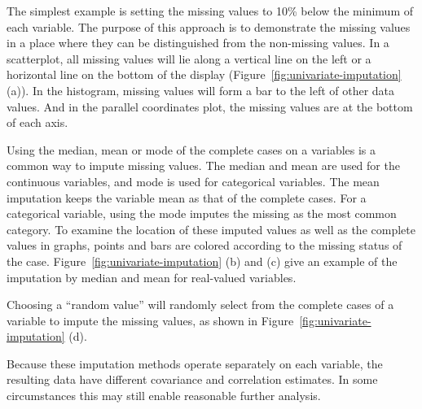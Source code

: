 \documentclass[article]{jss}
\begin{document}
The simplest example is setting the missing values to 10\% below the minimum of each variable. The purpose of this approach is to demonstrate the missing values in a place where they can be distinguished from the non-missing values. In a scatterplot, all missing values will lie along a vertical line on the left or a horizontal line on the bottom of the display (Figure~\ref{fig:univariate-imputation} (a)). In the histogram, missing values will form a bar to the left of other data values. And in the parallel coordinates plot, the missing values are at the bottom of each axis.

Using the median, mean or mode of the complete cases on a variables is a common way to impute missing values. The median and mean are used for the continuous variables, and mode is used for categorical variables. The mean imputation keeps the variable mean as that of the complete cases. For a categorical variable, using the mode imputes the missing as the most common category. To examine the location of these imputed values as well as the complete values in graphs, points and bars are colored according to the missing status of the case. Figure~\ref{fig:univariate-imputation} (b) and (c) give an example of the imputation by median and mean for real-valued variables.

Choosing a ``random value''  will randomly select from the complete cases of a variable to impute the missing values, as shown in Figure~\ref{fig:univariate-imputation} (d).

Because these imputation methods operate separately on each variable, the resulting data have different covariance and correlation estimates. In some circumstances this may still enable reasonable further analysis.
\end{document}
